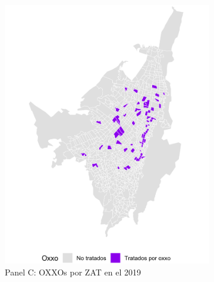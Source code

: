 \documentclass{article}
\begin{document}
\begin{figure} [H]
    \begin{subfigure}[b]{0.4\textwidth} %
        \includegraphics[width=\linewidth]{figs_oxxo_maps/mapa_oxxos_binary_2019.png}
        \caption{Panel C: OXXOs por ZAT en el 2019}
        \label{fig:panelC}
    \end{subfigure}
    \hfill
    \begin{subfigure}[b]{0.4\textwidth} %

\end{subfigure}
\end{figure}
\end{document}
